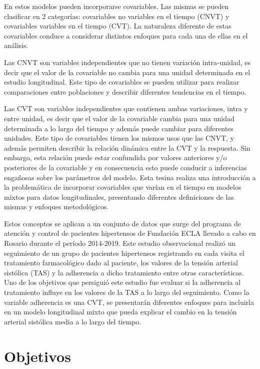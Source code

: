\documentclass[spanish]{article}
\numberwithin{figure}{subsection}
\numberwithin{equation}{subsection}
\numberwithin{table}{subsection}
\begin{document}
En estos modelos pueden incorporarse covariables. Las mismas se pueden
clasificar en 2 categorías: covariables no variables en el tiempo (CNVT) y
covariables variables en el tiempo (CVT). La naturaleza diferente de estas
covariables conduce a considerar distintos enfoques para cada una de ellas en el
análisis.

Las CNVT son variables independientes que no tienen variación intra-unidad, es
decir que el valor de la covariable no cambia para una unidad determinada en
el estudio longitudinal. Este tipo de covariables se pueden utilizar para
realizar comparaciones entre poblaciones y describir diferentes tendencias en el
tiempo.

Las CVT son variables independientes que contienen ambas variaciones, intra y
entre unidad, es decir que el valor de la covariable cambia para una unidad
determinada a lo largo del tiempo y además puede cambiar para diferentes
unidades. Este tipo de covariables tienen los mismos usos que las CNVT, y además
permiten describir la relación dinámica entre la CVT y la respuesta. Sin
embargo, esta relación puede estar confundida por valores anteriores y/o
posteriores de la covariable y en consecuencia esto puede conducir a inferencias
engañosas sobre los parámetros del modelo. Esta tesina realiza una introducción
a la problemática de incorporar covariables que varían en el tiempo en modelos
mixtos para datos longitudinales, presentando diferentes definiciones de las
mismas y enfoques metodológicos.

Estos conceptos se aplican a un conjunto de datos que surge del programa de
atención y control de pacientes hipertensos de Fundación ECLA llevado a cabo en
Rosario durante el período 2014-2019. Este estudio observacional realizó un
seguimiento de un grupo de pacientes hipertensos registrando en cada visita el
tratamiento farmacológico dado al paciente, los valores de la tensión arterial
sistólica (TAS) y la adherencia a dicho tratamiento entre otras características.
Uno de los objetivos que persiguió este estudio fue evaluar si la adherencia al
tratamiento influye en los valores de la TAS a lo largo del seguimiento. Como la
variable adherencia es una CVT, se presentarán diferentes enfoques para
incluirla en un modelo longitudinal mixto que pueda explicar el cambio en la
tensión arterial sistólica media a lo largo del tiempo.

\newpage
\section{Objetivos}
\end{document}
